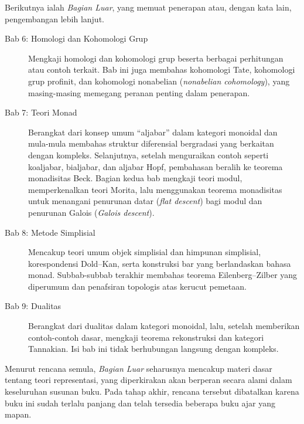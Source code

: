 Berikutnya ialah \emph{Bagian Luar}, yang memuat penerapan atau, dengan kata
lain, pengembangan lebih lanjut.
\begin{description}
	\item[Bab 6: Homologi dan Kohomologi Grup] Mengkaji homologi dan
	kohomologi grup beserta berbagai perhitungan atau contoh terkait. Bab ini
	juga membahas kohomologi Tate, kohomologi grup profinit, dan kohomologi
	nonabelian (\emph{nonabelian cohomology}), yang masing-masing memegang peranan penting dalam
	penerapan.
	\item[Bab 7: Teori Monad] Berangkat dari konsep umum ``aljabar'' dalam
	kategori monoidal dan mula-mula membahas struktur diferensial bergradasi
	yang berkaitan dengan kompleks. Selanjutnya, setelah menguraikan contoh
	seperti koaljabar, bialjabar, dan aljabar Hopf, pembahasan beralih ke
	teorema monadisitas Beck. Bagian kedua bab mengkaji teori modul,
	memperkenalkan teori Morita, lalu menggunakan teorema monadisitas untuk
	menangani penurunan datar (\emph{flat descent}) bagi
	modul dan penurunan Galois (\emph{Galois descent}).
	\item[Bab 8: Metode Simplisial] Mencakup teori umum objek simplisial dan
	himpunan simplisial, korespondensi Dold--Kan, serta konstruksi bar yang
	berlandaskan bahasa monad. Subbab-subbab terakhir membahas teorema
	Eilenberg--Zilber yang diperumum dan penafsiran topologis atas kerucut
	pemetaan.
	\item[Bab 9: Dualitas] Berangkat dari dualitas dalam kategori monoidal,
	lalu, setelah memberikan contoh-contoh dasar, mengkaji teorema
	rekonstruksi dan kategori Tannakian. Isi bab ini tidak berhubungan
	langsung dengan kompleks.
\end{description}

Menurut rencana semula, \emph{Bagian Luar} seharusnya mencakup materi dasar
tentang teori representasi, yang diperkirakan akan berperan secara alami dalam
keseluruhan susunan buku. Pada tahap akhir, rencana tersebut dibatalkan karena
buku ini sudah terlalu panjang dan telah tersedia beberapa buku ajar yang
mapan.

